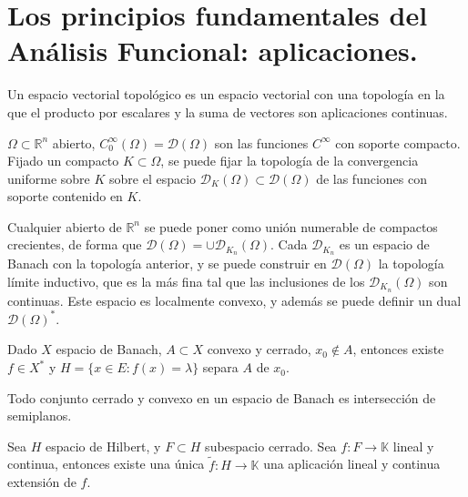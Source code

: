 \section{Los principios fundamentales del Análisis Funcional: aplicaciones.}


\begin{definition}
  Un espacio vectorial topológico es un espacio vectorial con una topología en
  la que el producto por escalares y la suma de vectores son aplicaciones
  continuas.
\end{definition}

\begin{example}
  $\Omega \subset \mathbb{R}^n$ abierto,
  $C^\infty_0(\Omega)=\mathcal{D}(\Omega)$ son las funciones $C^\infty$ con
  soporte compacto. Fijado un compacto $K\subset \Omega$, se puede fijar la
  topología de la convergencia uniforme sobre $K$ sobre el espacio
  $\mathcal{D}_K(\Omega)\subset \mathcal{D}(\Omega)$ de las funciones con
  soporte contenido en $K$.

  Cualquier abierto de $\mathbb{R}^n$ se puede poner como unión numerable de
  compactos crecientes, de forma que $\mathcal{D}(\Omega)=\cup
  \mathcal{D}_{K_n}(\Omega)$. Cada $\mathcal{D}_{K_n}$ es un espacio de Banach
  con la topología anterior, y se puede construir en $\mathcal{D}(\Omega)$ la
  topología límite inductivo, que es la más fina tal que las inclusiones de los
  $\mathcal{D}_{K_n}(\Omega)$ son continuas. Este espacio es localmente convexo,
  y además se puede definir un dual $\mathcal{D}(\Omega)^*$.
\end{example}

\begin{theorem}
  Dado $X$ espacio de Banach, $A \subset X$ convexo y cerrado, $x_0\not\in A$,
  entonces existe $f\in X^*$ y $H=\{x\in E:f(x)=\lambda\} $ separa $A$ de $x_0$.
\end{theorem}

\begin{corollary}
  Todo conjunto cerrado y convexo en un espacio de Banach es intersección de
  semiplanos.
\end{corollary}

\begin{theorem}
  Sea $H$ espacio de Hilbert, y $F\subset H$  subespacio cerrado. Sea $f:F\to
  \mathbb{K}$ lineal y continua, entonces existe una única $\tilde f:H\to
  \mathbb{K}$ una aplicación lineal y continua extensión de $f$.
\end{theorem}

